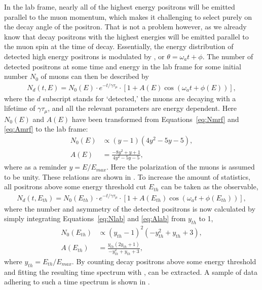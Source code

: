 In the lab frame, nearly all of the highest energy positrons will be emitted parallel to the muon momentum, which makes it challenging to select purely on the decay angle of the positron. That is not a problem however, as we already know that decay positrons with the highest energies will be emitted parallel to the muon spin at the time of decay. Essentially, the energy distribution of detected high energy positrons is modulated by \wa, or $\theta = \omega_{a}t + \phi$. The number of detected positrons at some time and energy in the lab frame for some initial number $N_{0}$ of muons can then be described by
        \begin{align}
            N_{d}(t, E) = N_{0}(E) \cdot e^{-t/\gamma\tau_{\mu}} \cdot [1 + A(E) \cos(\omega_{a}t+\phi(E))],
        \end{align}
where the $d$ subscript stands for `detected,' the muons are decaying with a lifetime of $\gamma\tau_{\mu}$, and all the relevant parameters are energy dependent. Here $N_{0}(E)$ and $A(E)$ have been transformed from Equations~\ref{eq:Nmrf} and \ref{eq:Amrf} to the lab frame:
        \begin{align}
            N_{0}(E) &\propto (y-1)(4y^{2}-5y-5), \label{eq:Nlab} \\
            A(E) &= \frac{-8y^{2}+y+1}{4y^{2}-5y-5}, \label{eq:Alab}
        \end{align}
where as a reminder $y=E/E_{max}$. Here the polarization of the muons is assumed to be unity. These relations are shown in . To increase the amount of statistics, all positrons above some energy threshold cut $E_{th}$ can be taken as the observable,
        \begin{align} \label{eq:5parfunc}
            N_{d}(t, E_{th}) = N_{0}(E_{th}) \cdot e^{-t/\gamma\tau_{\mu}} \cdot [1 + A(E_{th}) \cos(\omega_{a}t+\phi(E_{th}))],
        \end{align}
where the number and asymmetry of the detected positrons is now calculated by simply integrating Equations~\ref{eq:Nlab} and \ref{eq:Alab} from $y_{th}$ to 1,
        \begin{align}
            N_{0}(E_{th}) &\propto (y_{th}-1)^{2}(-y_{th}^{2}+y_{th}+3), \label{eq:Nth} \\
            A(E_{th}) &= \frac{y_{th}(2y_{th}+1)}{-y_{th}^{2}+y_{th}+3}, \label{eq:Ath}
        \end{align}
where $y_{th}=E_{th}/E_{max}$. By counting decay positrons above some energy threshold and fitting the resulting time spectrum with , \wa can be extracted. A sample of data adhering to such a time spectrum is shown in .


